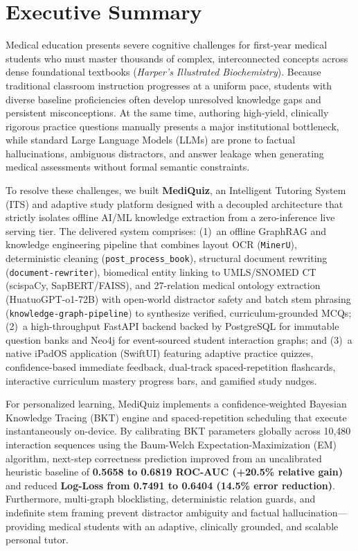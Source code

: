 \section*{Executive Summary}

Medical education presents severe cognitive challenges for first-year medical students who must master thousands of complex, interconnected concepts across dense foundational textbooks (\textit{Harper's Illustrated Biochemistry}). Because traditional classroom instruction progresses at a uniform pace, students with diverse baseline proficiencies often develop unresolved knowledge gaps and persistent misconceptions. At the same time, authoring high-yield, clinically rigorous practice questions manually presents a major institutional bottleneck, while standard Large Language Models (LLMs) are prone to factual hallucinations, ambiguous distractors, and answer leakage when generating medical assessments without formal semantic constraints.

To resolve these challenges, we built \textbf{MediQuiz}, an Intelligent Tutoring System (ITS) and adaptive study platform designed with a decoupled architecture that strictly isolates offline AI/ML knowledge extraction from a zero-inference live serving tier. The delivered system comprises: (1)~an offline GraphRAG and knowledge engineering pipeline that combines layout OCR (\texttt{MinerU}), deterministic cleaning (\texttt{post\_process\_book}), structural document rewriting (\texttt{document-rewriter}), biomedical entity linking to UMLS/SNOMED CT (scispaCy, SapBERT/FAISS), and 27-relation medical ontology extraction (HuatuoGPT-o1-72B) with open-world distractor safety and batch stem phrasing (\texttt{knowledge-graph-pipeline}) to synthesize verified, curriculum-grounded MCQs; (2)~a high-throughput FastAPI backend backed by PostgreSQL for immutable question banks and Neo4j for event-sourced student interaction graphs; and (3)~a native iPadOS application (SwiftUI) featuring adaptive practice quizzes, confidence-based immediate feedback, dual-track spaced-repetition flashcards, interactive curriculum mastery progress bars, and gamified study nudges.

For personalized learning, MediQuiz implements a confidence-weighted Bayesian Knowledge Tracing (BKT) engine and spaced-repetition scheduling that execute instantaneously on-device. By calibrating BKT parameters globally across 10,480 interaction sequences using the Baum-Welch Expectation-Maximization (EM) algorithm, next-step correctness prediction improved from an uncalibrated heuristic baseline of \textbf{0.5658 to 0.6819 ROC-AUC (+20.5\% relative gain)} and reduced \textbf{Log-Loss from 0.7491 to 0.6404 (14.5\% error reduction)}. Furthermore, multi-graph blocklisting, deterministic relation guards, and indefinite stem framing prevent distractor ambiguity and factual hallucination---providing medical students with an adaptive, clinically grounded, and scalable personal tutor.

